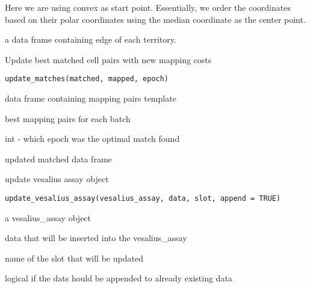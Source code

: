 \documentclass[a4paper]{book}
\begin{document}
%
\begin{Details}
Here we are using convex as start point. Essentially, we 
order the coordinates based on their polar coordinates using the 
median coordinate as the center point.
\end{Details}
%
\begin{Value}
a data frame containing edge of each territory.
\end{Value}
%
\begin{Description}
Update best matched cell pairs with new mapping costs
\end{Description}
%
\begin{Usage}
\begin{verbatim}
update_matches(matched, mapped, epoch)
\end{verbatim}
\end{Usage}
%
\begin{Arguments}
\begin{ldescription}
\item[\code{matched}] data frame containing mapping pairs template

\item[\code{mapped}] best mapping pairs for each batch

\item[\code{epoch}] int - which epoch was the optimal match found
\end{ldescription}
\end{Arguments}
%
\begin{Value}
updated matched data frame
\end{Value}
%
\begin{Description}
update vesalius assay object
\end{Description}
%
\begin{Usage}
\begin{verbatim}
update_vesalius_assay(vesalius_assay, data, slot, append = TRUE)
\end{verbatim}
\end{Usage}
%
\begin{Arguments}
\begin{ldescription}
\item[\code{vesalius\_assay}] a vesalius\_assay object

\item[\code{data}] data that will be inserted into the vesalius\_assay

\item[\code{slot}] name of the slot that will be updated

\item[\code{append}] logical if the dats hould be appended to already existing data
\end{ldescription}
\end{Arguments}
\end{document}
